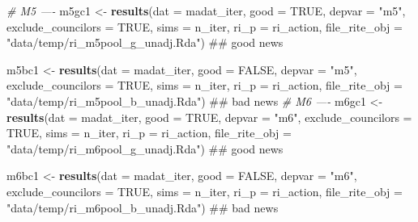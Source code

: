 \documentclass[]{article}
\newenvironment{Shaded}{\begin{snugshade}}{\end{snugshade}}
\newcommand{\KeywordTok}[1]{\textcolor[rgb]{0.13,0.29,0.53}{\textbf{#1}}}
\newcommand{\DataTypeTok}[1]{\textcolor[rgb]{0.13,0.29,0.53}{#1}}
\newcommand{\StringTok}[1]{\textcolor[rgb]{0.31,0.60,0.02}{#1}}
\newcommand{\CommentTok}[1]{\textcolor[rgb]{0.56,0.35,0.01}{\textit{#1}}}
\newcommand{\OtherTok}[1]{\textcolor[rgb]{0.56,0.35,0.01}{#1}}
\newcommand{\NormalTok}[1]{#1}
\begin{document}
\begin{Shaded}
\begin{Highlighting}[]
\CommentTok{# M5 ----}
\NormalTok{m5gc1 <-}\StringTok{ }\KeywordTok{results}\NormalTok{(}\DataTypeTok{dat =}\NormalTok{ madat_iter, }\DataTypeTok{good =} \OtherTok{TRUE}\NormalTok{, }\DataTypeTok{depvar =} \StringTok{"m5"}\NormalTok{, }\DataTypeTok{exclude_councilors =} \OtherTok{TRUE}\NormalTok{, }\DataTypeTok{sims =}\NormalTok{ n_iter,}
                 \DataTypeTok{ri_p =}\NormalTok{ ri_action, }\DataTypeTok{file_rite_obj =} \StringTok{"data/temp/ri_m5pool_g_unadj.Rda"}\NormalTok{)}
\NormalTok{## good news}

\NormalTok{m5bc1 <-}\StringTok{ }\KeywordTok{results}\NormalTok{(}\DataTypeTok{dat =}\NormalTok{ madat_iter, }\DataTypeTok{good =} \OtherTok{FALSE}\NormalTok{, }\DataTypeTok{depvar =} \StringTok{"m5"}\NormalTok{, }\DataTypeTok{exclude_councilors =} \OtherTok{TRUE}\NormalTok{, }\DataTypeTok{sims =}\NormalTok{ n_iter,}
                   \DataTypeTok{ri_p =}\NormalTok{ ri_action, }\DataTypeTok{file_rite_obj =} \StringTok{"data/temp/ri_m5pool_b_unadj.Rda"}\NormalTok{) ## bad news}
\CommentTok{# M6 ----}
\NormalTok{m6gc1 <-}\StringTok{ }\KeywordTok{results}\NormalTok{(}\DataTypeTok{dat =}\NormalTok{ madat_iter, }\DataTypeTok{good =} \OtherTok{TRUE}\NormalTok{, }\DataTypeTok{depvar =} \StringTok{"m6"}\NormalTok{, }\DataTypeTok{exclude_councilors =} \OtherTok{TRUE}\NormalTok{, }\DataTypeTok{sims =}\NormalTok{ n_iter,}
                   \DataTypeTok{ri_p =}\NormalTok{ ri_action, }\DataTypeTok{file_rite_obj =} \StringTok{"data/temp/ri_m6pool_g_unadj.Rda"}\NormalTok{)  ## good news}

\NormalTok{m6bc1 <-}\StringTok{ }\KeywordTok{results}\NormalTok{(}\DataTypeTok{dat =}\NormalTok{ madat_iter, }\DataTypeTok{good =} \OtherTok{FALSE}\NormalTok{, }\DataTypeTok{depvar =} \StringTok{"m6"}\NormalTok{, }\DataTypeTok{exclude_councilors =} \OtherTok{TRUE}\NormalTok{, }\DataTypeTok{sims =}\NormalTok{ n_iter,}
                   \DataTypeTok{ri_p =}\NormalTok{ ri_action, }\DataTypeTok{file_rite_obj =} \StringTok{"data/temp/ri_m6pool_b_unadj.Rda"}\NormalTok{) ## bad news}
\end{Highlighting}
\end{Shaded}
\end{document}
